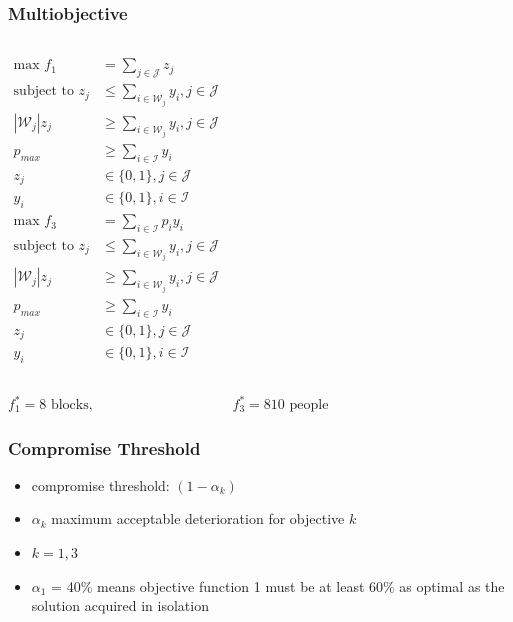 \documentclass[10pt, compress]{beamer}
\begin{document}
\begin{frame}[fragile]
\frametitle{Multiobjective}
\begin{columns}[onlytextwidth]
\begin{align*}
\textrm{max } f_1 &= \sum_{j \in \mathcal{J}} z_j \\
\textrm{subject to } z_j &\leq \sum_{i \in \mathcal{W}_j} y_i, j \in \mathcal{J}\\
\left|\mathcal{W}_j\right|z_j &\geq \sum_{i \in \mathcal{W}_j} y_i, j \in \mathcal{J} \\
p_{max} &\geq \sum_{i \in \mathcal{I}} y_i  \\
z_j &\in \{0,1\}, j \in \mathcal{J} \\
y_i &\in \{0,1\}, i \in \mathcal{I}
\end{align*}
\begin{align*}
\textrm{max } f_3 &= \sum_{i \in \mathcal{I}} p_iy_i \\
\textrm{subject to } z_j &\leq \sum_{i \in \mathcal{W}_j} y_i, j \in \mathcal{J}\\
\left|\mathcal{W}_j\right|z_j &\geq \sum_{i \in \mathcal{W}_j} y_i, j \in \mathcal{J} \\
p_{max} &\geq \sum_{i \in \mathcal{I}} y_i  \\
z_j &\in \{0,1\}, j \in \mathcal{J} \\
y_i &\in \{0,1\}, i \in \mathcal{I}
\end{align*}
\end{columns}
\begin{center}
\quad \quad \quad \quad \alert{$f_1^* = 8 \textrm{ blocks,} \quad \quad \quad \quad \quad \quad \quad \quad \quad \quad f_3^* = 810 \textrm{ people}$}
\end{center}
\end{frame}

\begin{frame}[fragile]
\frametitle{Compromise Threshold}
\begin{itemize}[<+- | alert@+>]
\item compromise threshold: $(1-\alpha_k)$
\item $\alpha_k$ maximum acceptable deterioration for objective $k$
\item $k=1,3$
\item $\alpha_1$ = 40\% means objective function 1 must be at least $60\%$ as optimal as the solution acquired in isolation
\end{itemize}
\end{frame}
\end{document}
